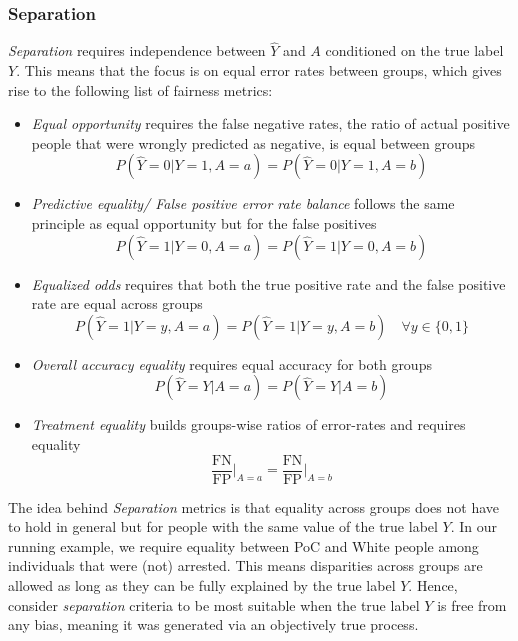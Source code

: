 \subsubsection*{Separation}
\textit{Separation} requires independence between $\hat{Y}$ and $A$ conditioned on the true label $Y$. This means that the focus is on equal error rates between groups, which gives rise to the following list of fairness metrics:
\begin{itemize}
    \item \textit{Equal opportunity} requires the false negative rates, the ratio of actual positive people that were wrongly predicted as negative, is equal between groups $$P(\hat{Y} = 0 | Y = 1, A = a) = P(\hat{Y} = 0 | Y = 1, A = b)$$
    \item \textit{Predictive equality/ False positive error rate balance} follows the same principle as equal opportunity but for the false positives $$P(\hat{Y} = 1 | Y = 0, A = a) = P(\hat{Y} = 1 | Y = 0, A = b)$$
    \item \textit{Equalized odds} requires that both the true positive rate and the false positive rate are equal across groups $$P(\hat{Y} = 1 | Y = y, A = a) = P(\hat{Y} = 1 | Y = y, A = b) \quad \forall y \in \{0, 1\}$$ 
    \item \textit{Overall accuracy equality} requires equal accuracy for both groups $$P(\hat{Y} = Y | A = a) = P(\hat{Y} = Y | A = b)$$ 
    \item \textit{Treatment equality} builds groups-wise ratios of error-rates and requires equality $$\frac{\text{FN}}{\text{FP}} \big|_{A = a} = \frac{\text{FN}}{\text{FP}} \big|_{A = b}$$
\end{itemize}
The idea behind \textit{Separation} metrics is that equality across groups does not have to hold in general but for people with the same value of the true label $Y$. In our running example, we require equality between PoC and White people among individuals that were (not) arrested. 
This means disparities across groups are allowed as long as they can be fully explained by the true label $Y$. Hence, \cite{castelnovo2022} consider \textit{separation} criteria to be most suitable when the true label $Y$ is free from any bias, meaning it was generated via an objectively true process.

